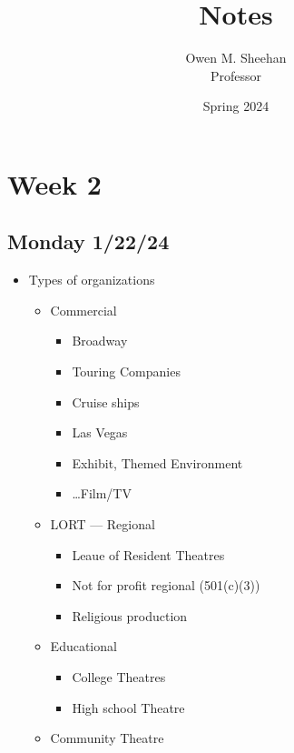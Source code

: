 \documentclass[12pt]{article}
\title{\class{} Notes}
\author{Owen M. Sheehan\\Professor \prof{}}
\date{Spring 2024}
\begin{document}
\maketitle
\tableofcontents
\newpage

    \section{Week 2}
        \subsection{Monday 1/22/24}
            \begin{itemize}
                \item Types of organizations
                \begin{itemize}
                    \item Commercial
                    \begin{itemize}
                        \item Broadway
                        \item Touring Companies
                        \item Cruise ships
                        \item Las Vegas
                        \item Exhibit, Themed Environment
                        \item \dots Film/TV
                    \end{itemize}
                    \item LORT --- Regional
                    \begin{itemize}
                        \item Leaue of Resident Theatres
                        \item Not for profit regional (501(c)(3))
                        \item Religious production
                    \end{itemize}
                    \item Educational
                    \begin{itemize}
                        \item College Theatres
                        \item High school Theatre
                    \end{itemize}
                    \item Community Theatre
                \end{itemize}

\end{itemize}
\end{document}
